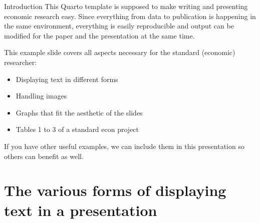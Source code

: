 \documentclass[11pt, aspectratio=169, t]{beamer}
\def\tightlist{}
\def\tightlist{}
\providecommand{\tightlist}{%
	\setlength{\itemsep}{0pt}\setlength{\parskip}{0pt}}
\begin{document}




\begin{frame}{Introduction}
\protect\hypertarget{introduction}{}
This Quarto template is supposed to make writing and presenting economic
research easy. Since everything from data to publication is happening in
the same environment, everything is easily reproducible and output can
be modified for the paper and the presentation at the same time.

This example slide covers all aspects necessary for the standard
(economic) researcher:

\begin{itemize}
\tightlist
\item
  Displaying text in different forms
\item
  Handling images
\item
  Graphs that fit the aesthetic of the slides
\item
  Tables 1 to 3 of a standard econ project
\end{itemize}

If you have other useful examples, we can include them in this
presentation so others can benefit as well.
\end{frame}

\hypertarget{the-various-forms-of-displaying-text-in-a-presentation}{%
\section{The various forms of displaying text in a
presentation}\label{the-various-forms-of-displaying-text-in-a-presentation}}
\end{document}
